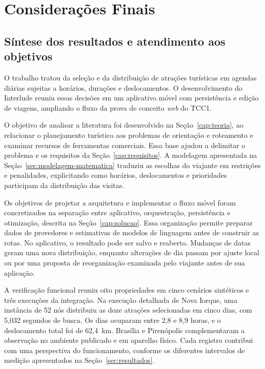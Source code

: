 \chapter[Considerações Finais]{Considerações Finais}
\label{cap:consideracoes}

\section{Síntese dos resultados e atendimento aos objetivos}

O trabalho tratou da seleção e da distribuição de atrações turísticas em agendas diárias sujeitas a horários, durações e deslocamentos. O desenvolvimento do Interlude reuniu essas decisões em um aplicativo móvel com persistência e edição de viagens, ampliando o fluxo da prova de conceito \textit{web} do TCC1.

O objetivo de analisar a literatura foi desenvolvido na Seção~\ref{cap:teoria}, ao relacionar o planejamento turístico aos problemas de orientação e roteamento e examinar recursos de ferramentas comerciais. Essa base ajudou a delimitar o problema e os requisitos da Seção~\ref{cap:requisitos}. A modelagem apresentada na Seção~\ref{sec:modelagem-matematica} traduziu as escolhas do viajante em restrições e penalidades, explicitando como horários, deslocamentos e prioridades participam da distribuição das visitas.

Os objetivos de projetar a arquitetura e implementar o fluxo móvel foram concretizados na separação entre aplicativo, orquestração, persistência e otimização, descrita na Seção~\ref{cap:solucao}. Essa organização permite preparar dados de provedores e estimativas de modelos de linguagem antes de construir as rotas. No aplicativo, o resultado pode ser salvo e reaberto. Mudanças de datas geram uma nova distribuição, enquanto alterações de dia passam por ajuste local ou por uma proposta de reorganização examinada pelo viajante antes de sua aplicação.

A verificação funcional reuniu oito propriedades em cinco cenários sintéticos e três execuções da integração. Na execução detalhada de Nova Iorque, uma instância de 52 nós distribuiu as doze atrações selecionadas em cinco dias, com 5,032 segundos de busca. Os dias ocuparam entre 2,8 e 8,9 horas, e o deslocamento total foi de 62,4~km. Brasília e Pirenópolis complementaram a observação no ambiente publicado e em aparelho físico. Cada registro contribui com uma perspectiva do funcionamento, conforme os diferentes intervalos de medição apresentados na Seção~\ref{sec:resultados}.


